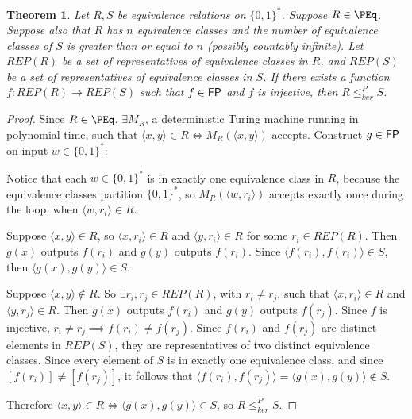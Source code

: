 \documentclass{article}
\newtheorem{theorem}{Theorem}[section]
\theoremstyle{definition} \newtheorem{definition}[definition]{Definition}
\newcommand{\sigmastar}{\{0, 1\}^{*}} %
\newcommand{\kr}{\leq^{P}_{ker}} %
\newcommand{\pair}[2]{\langle#1,#2\rangle} %
\begin{document}
\begin{theorem}\label{thm:repr_kr}
  Let $R,S$ be equivalence relations on $\sigmastar$. Suppose
  $R\in\PEq$. Suppose also that $R$ has $n$ equivalence classes and the number
  of equivalence classes of $S$ is greater than or equal to $n$ (possibly
  countably infinite). Let $REP(R)$ be a set of representatives of equivalence
  classes in $R$, and $REP(S)$ be a set of representatives of equivalence
  classes in $S$. If there exists a function $f\colon REP(R)\to REP(S)$ such
  that $f\in{\ensuremath{\mathsf{FP}}}$ and $f$ is injective, then $R\kr S$.
\end{theorem}
\begin{proof}
  Since $R\in\PEq$, $\exists M_R$, a deterministic Turing machine running in
  polynomial time, such that $\pair{x}{y}\in R\iff M_R(\pair{x}{y})$
  accepts. Construct $g\in{\ensuremath{\mathsf{FP}}}$ on input $w\in\sigmastar$:\\
  \begin{algorithm}[H]
    \For{$r_i\in REP(R)$}{
      \If{$M_R(\pair{w}{r_i})$ accepts}{
        \Return{$f(r_i)$}
      }
    }
  \end{algorithm}
  Notice that each $w\in\sigmastar$ is in exactly one equivalence class in $R$,
  because the equivalence classes partition $\sigmastar$, so
  $M_R(\pair{w}{r_i})$ accepts exactly once during the loop, when
  $\pair{w}{r_i}\in R$.

  Suppose $\pair{x}{y}\in R$, so $\pair{x}{r_i}\in R$ and $\pair{y}{r_i}\in R$
  for some $r_i\in REP(R)$. Then $g(x)$ outputs $f(r_i)$ and $g(y)$ outputs
  $f(r_i)$. Since $\pair{f(r_i)}{f(r_i)}\in S$, then $\pair{g(x)}{g(y)}\in S$.

  Suppose $\pair{x}{y}\notin R$. So $\exists r_i, r_j\in REP(R)$, with $r_i\neq
  r_j$, such that $\pair{x}{r_i}\in R$ and $\pair{y}{r_j}\in R$. Then $g(x)$
  outputs $f(r_i)$ and $g(y)$ outputs $f(r_j)$. Since $f$ is injective,
  $r_i\neq r_j\implies f(r_i)\neq f(r_j)$. Since $f(r_i)$ and $f(r_j)$ are
  distinct elements in $REP(S)$, they are representatives of two distinct
  equivalence classes. Since every element of $S$ is in exactly one equivalence
  class, and since $[f(r_i)]\neq[f(r_j)]$, it follows that
  $\pair{f(r_i)}{f(r_j)}=\pair{g(x)}{g(y)}\notin S$.

  Therefore $\pair{x}{y}\in R\iff \pair{g(x)}{g(y)}\in S$, so $R\kr S$.
\end{proof}
\end{document}
